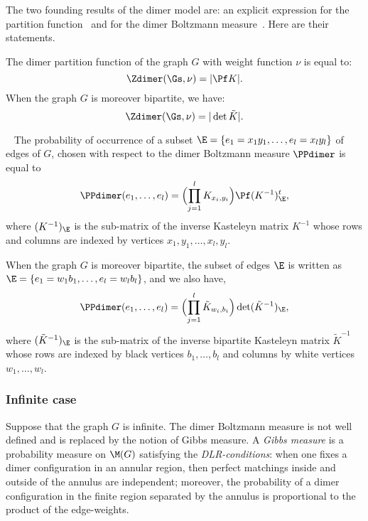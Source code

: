 \documentclass[a4paper,twoside,11pt]{article}
\begin{document}
The two founding results of the dimer model are: an explicit expression for the partition 
function~\cite{Kasteleyn1,Kasteleyn2,TF} and for the dimer Boltzmann measure~\cite{Kenyon0}. Here are their statements. 

\begin{thm}
The dimer partition function of the graph $G$ with weight function $\nu$ is equal to:
\begin{equation*}
\Zdimer(\Gs,\nu)=|\Pf K |.
\end{equation*}
When the graph $G$ is moreover bipartite, we have:
\begin{equation*}
\Zdimer(\Gs,\nu)=|\det \tilde{K}|.
\end{equation*}
\end{thm}

\begin{thm}~\label{thm:Kenyon0}
The probability of occurrence of a subset $\E=\{e_1=x_1 y_1,\dots,e_l=x_l y_l\}$ of edges of $G$, chosen with respect to the dimer Boltzmann
measure $\PPdimer$ is equal to
\begin{equation*}
\PPdimer(e_1,\dots,e_l)=\Bigl(\prod_{j=1}^l K_{x_i,y_i}\Bigr)\Pf (K^{-1})^t_{\E},
\end{equation*}
where $(K^{-1})_{\E}$ is the sub-matrix of the inverse Kasteleyn matrix $K^{-1}$ whose rows and columns are indexed by vertices 
$x_1,y_1,\dots,x_l,y_l$.

When the graph $G$ is moreover bipartite, the subset of edges $\E$ is written as 
$\E=\{e_1=w_1b_1,\dots,e_l=w_l b_l\}$, and we also have,
\begin{equation*}
\PPdimer(e_1,\dots,e_l)=\Bigl(\prod_{j=1}^l \tilde{K}_{w_i,b_i}\Bigr)\det (\tilde{K}^{-1})_{\E},
\end{equation*}
where $(\tilde{K}^{-1})_{\E}$ is the sub-matrix of the inverse bipartite Kasteleyn matrix $\tilde{K}^{-1}$ whose rows are indexed
by black vertices $b_1,\dots,b_l$ and columns by white vertices $w_1,\dots,w_l$.
\end{thm}

\subsubsection{Infinite case}\label{sec:dimer_infinite}

Suppose that the graph $G$ is infinite. The dimer Boltzmann measure is not well defined and is replaced by the notion of 
Gibbs measure. A 
\emph{Gibbs measure} is a probability measure on $\M(G)$ satisfying the \emph{DLR-conditions}:
when one fixes a dimer configuration in an annular region, then
perfect matchings inside and outside of the annulus are independent; moreover, the probability of a dimer configuration in the finite
region separated by the annulus is proportional to the product of the edge-weights. 
\end{document}
